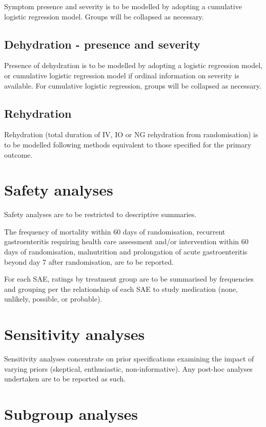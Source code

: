 \documentclass[a4paper]{article}
\begin{document}
Symptom presence and severity is to be modelled by adopting a cumulative logistic regression model.
Groups will be collapsed as necessary.

\subsection{Dehydration - presence and severity}

Presence of dehydration is to be modelled by adopting a logistic regression model, or cumulative logistic regression model if ordinal information on severity is available.
For cumulative logistic regression, groups will be collapsed as necessary.

\subsection{Rehydration}

Rehydration (total duration of IV, IO or NG rehydration from randomisation) is to be modelled following methods equivalent to those specified for the primary outcome. 

\section{Safety analyses}

Safety analyses are to be restricted to descriptive summaries.

The frequency of mortality within 60 days of randomisation, recurrent gastroenteritis requiring health care assessment and/or intervention within 60 days of randomisation, malnutrition and prolongation of acute gastroenteritis beyond day 7 after randomisation, are to be reported. 

For each SAE, ratings by treatment group are to be summarised by frequencies and grouping per the relationship of each SAE to study medication (none, unlikely, possible, or probable).

\section{Sensitivity analyses}

Sensitivity analyses concentrate on prior specifications examining the impact of varying priors (skeptical, enthusiastic, non-informative).
Any post-hoc analyses undertaken are to be reported as such.

\section{Subgroup analyses}
\end{document}

